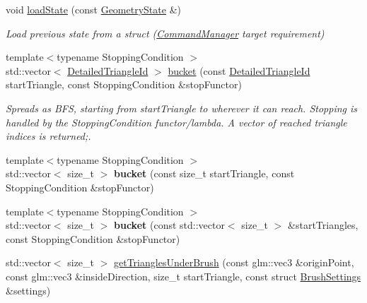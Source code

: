 \begin{DoxyCompactItemize}
\mbox{\label{classpepr3d_1_1_geometry_aebe9b03fabcd1d3fca4108eaf34c6e70}} 
void \mbox{\hyperlink{classpepr3d_1_1_geometry_aebe9b03fabcd1d3fca4108eaf34c6e70}{load\+State}} (const \mbox{\hyperlink{structpepr3d_1_1_geometry_1_1_geometry_state}{Geometry\+State}} \&)
\begin{DoxyCompactList}\small\item\em Load previous state from a struct (\mbox{\hyperlink{classpepr3d_1_1_command_manager}{Command\+Manager}} target requirement) \end{DoxyCompactList}\item 
\mbox{\label{classpepr3d_1_1_geometry_a4a49d4588081ba91381fbd86e3837e75}} 
{\footnotesize template$<$typename Stopping\+Condition $>$ }\\std\+::vector$<$ \mbox{\hyperlink{structpepr3d_1_1_detailed_triangle_id}{Detailed\+Triangle\+Id}} $>$ \mbox{\hyperlink{classpepr3d_1_1_geometry_a4a49d4588081ba91381fbd86e3837e75}{bucket}} (const \mbox{\hyperlink{structpepr3d_1_1_detailed_triangle_id}{Detailed\+Triangle\+Id}} start\+Triangle, const Stopping\+Condition \&stop\+Functor)
\begin{DoxyCompactList}\small\item\em Spreads as B\+FS, starting from start\+Triangle to wherever it can reach. Stopping is handled by the Stopping\+Condition functor/lambda. A vector of reached triangle indices is returned;. \end{DoxyCompactList}\item 
\mbox{\label{classpepr3d_1_1_geometry_a7a6b768a13d349b8e5a88e1210e034fb}} 
{\footnotesize template$<$typename Stopping\+Condition $>$ }\\std\+::vector$<$ size\+\_\+t $>$ {\bfseries bucket} (const size\+\_\+t start\+Triangle, const Stopping\+Condition \&stop\+Functor)
\item 
\mbox{\label{classpepr3d_1_1_geometry_a982d86bb64738f64e4de60017e1a4ee3}} 
{\footnotesize template$<$typename Stopping\+Condition $>$ }\\std\+::vector$<$ size\+\_\+t $>$ {\bfseries bucket} (const std\+::vector$<$ size\+\_\+t $>$ \&start\+Triangles, const Stopping\+Condition \&stop\+Functor)
\item 
std\+::vector$<$ size\+\_\+t $>$ \mbox{\hyperlink{classpepr3d_1_1_geometry_a1d420e96bc8c92c620b5473677173d81}{get\+Triangles\+Under\+Brush}} (const glm\+::vec3 \&origin\+Point, const glm\+::vec3 \&inside\+Direction, size\+\_\+t start\+Triangle, const struct \mbox{\hyperlink{structpepr3d_1_1_brush_settings}{Brush\+Settings}} \&settings)

\end{DoxyCompactItemize}
